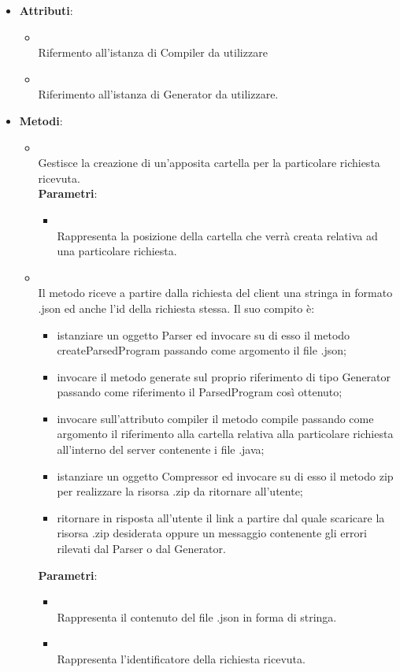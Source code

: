 \begin{itemize}
\item \textbf{Attributi}:
\begin{itemize}
\item {}
\\ Rifermento all'istanza di Compiler da utilizzare
\item {}
\\ Riferimento all'istanza di Generator da utilizzare.
\end{itemize}
\item \textbf{Metodi}:
\begin{itemize}
\item {}
\\ Gestisce la creazione di un'apposita cartella per la particolare richiesta ricevuta.
\\ \textbf{Parametri}:
\begin{itemize}
\item {}
\\ Rappresenta la posizione della cartella che verrà creata relativa ad una particolare richiesta.
\end{itemize}
\item {}
\\ Il metodo riceve a partire dalla richiesta del client una stringa in formato .json ed anche l'id della richiesta stessa.
Il suo compito è:
\begin{itemize}
\item istanziare un oggetto Parser ed invocare su di esso il metodo createParsedProgram passando come argomento il file .json;
\item invocare il metodo generate sul proprio riferimento di tipo Generator passando come riferimento il ParsedProgram così ottenuto;
\item invocare sull'attributo compiler il metodo compile passando come argomento il riferimento alla cartella relativa alla particolare richiesta all'interno del server contenente i file .java;
\item istanziare un oggetto Compressor ed invocare su di esso il metodo zip per realizzare la risorsa .zip da ritornare all'utente;
\item ritornare in risposta all'utente il link a partire dal quale scaricare la risorsa .zip desiderata oppure un messaggio contenente gli errori rilevati dal Parser o dal Generator.
\end{itemize}
\textbf{Parametri}:
\begin{itemize}
\item {}
\\ Rappresenta il contenuto del file .json in forma di stringa.
\item {}
\\ Rappresenta l'identificatore della richiesta ricevuta.
\end{itemize}
\end{itemize}
\end{itemize}
